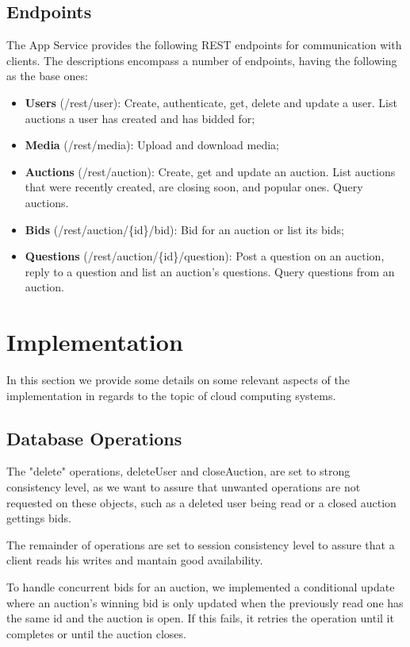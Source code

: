 \documentclass[runningheads]{llncs}
\begin{document}
\subsection{Endpoints}

The App Service provides the following REST endpoints for communication with clients. The descriptions encompass a number of endpoints, having the following as the base ones:

\begin{itemize}
    \item \textbf{Users} (/rest/user): Create, authenticate, get, delete and update a user. List auctions a user has created and has bidded for;
    \item \textbf{Media} (/rest/media): Upload and download media;
    \item \textbf{Auctions} (/rest/auction): Create, get and update an auction. List auctions that were recently created, are closing soon, and popular ones. Query auctions.
    \item \textbf{Bids} (/rest/auction/\{id\}/bid): Bid for an auction or list its bids;
    \item \textbf{Questions} (/rest/auction/\{id\}/question): Post a question on an auction, reply to a question and list an auction's questions. Query questions from an auction.
\end{itemize}


\section{Implementation}

In this section we provide some details on some relevant aspects of the implementation in regards to the topic of cloud computing systems.

\subsection{Database Operations}

The "delete" operations, deleteUser and closeAuction, are set to strong consistency level, as we want to assure that unwanted operations are not requested on these objects, such as a deleted user being read or a closed auction gettings bids.

The remainder of operations are set to session consistency level to assure that a client reads his writes and mantain good availability.

To handle concurrent bids for an auction, we implemented a conditional update where an auction's winning bid is only updated when the previously read one has the same id and the auction is open. If this fails, it retries the operation until it completes or until the auction closes.
\end{document}
